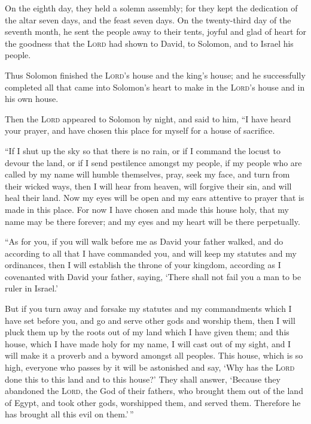  On the eighth day, they held a solemn assembly; for they
kept the dedication of the altar seven days, and the feast seven days.
 On the twenty-third day of the seventh month, he sent
the people away to their tents, joyful and glad of heart for the
goodness that the \textsc{Lord} had shown to David, to Solomon, and to
Israel his people.

 Thus Solomon finished the \textsc{Lord}'s house and the
king's house; and he successfully completed all that came into Solomon's
heart to make in the \textsc{Lord}'s house and in his own house.

 Then the \textsc{Lord} appeared to Solomon by night, and
said to him, ``I have heard your prayer, and have chosen this place for
myself for a house of sacrifice.

 ``If I shut up the sky so that there is no rain, or if I
command the locust to devour the land, or if I send pestilence amongst
my people,  if my people who are called by my name will
humble themselves, pray, seek my face, and turn from their wicked ways,
then I will hear from heaven, will forgive their sin, and will heal
their land.  Now my eyes will be open and my ears
attentive to prayer that is made in this place.  For now
I have chosen and made this house holy, that my name may be there
forever; and my eyes and my heart will be there perpetually.

 ``As for you, if you will walk before me as David your
father walked, and do according to all that I have commanded you, and
will keep my statutes and my ordinances,  then I will
establish the throne of your kingdom, according as I covenanted with
David your father, saying, `There shall not fail you a man to be ruler
in Israel.'

 But if you turn away and forsake my statutes and my
commandments which I have set before you, and go and serve other gods
and worship them,  then I will pluck them up by the roots
out of my land which I have given them; and this house, which I have
made holy for my name, I will cast out of my sight, and I will make it a
proverb and a byword amongst all peoples.  This house,
which is so high, everyone who passes by it will be astonished and say,
`Why has the \textsc{Lord} done this to this land and to this house?'
 They shall answer, `Because they abandoned the
\textsc{Lord}, the God of their fathers, who brought them out of the
land of Egypt, and took other gods, worshipped them, and served them.
Therefore he has brought all this evil on them.'\,''

